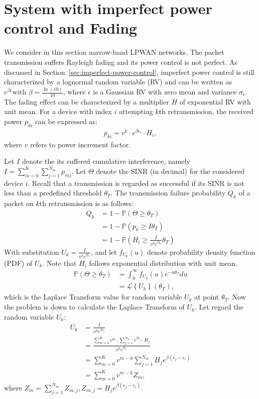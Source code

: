 \section{System with imperfect power control and Fading}
We consider in this section narrow-band LPWAN networks. The packet transmission suffers Rayleigh fading and its power control is not perfect. As discussed in Section~\ref{sec:imperfect-power-control}, imperfect power control is still characterized by a lognormal random variable (RV) and can be written as $e^{\beta\epsilon} \text{with }\beta = \frac{\ln(10)}{10}$, where $\epsilon$ is a Gaussian RV with zero mean and variance $\sigma_{\epsilon}$. The fading effect can be characterized by a multiplier $H$ of exponential RV with unit mean. For a device with index $i$ attempting $k$th retransmission, the received power $p_{ki}$ can be expressed as:
\begin{align*}
	p_{ki} = v^k \cdot e^{\beta\epsilon_i}\cdot H_i,
\end{align*}
where $v$ refers to power increment factor. 

Let $I$ denote the its suffered cumulative interference, namely $I =\sum_{m=0 }^{K} \sum_{j=1}^{N_m} p_{mj}$.
Let $\Theta$ denote the SINR (in decimal) for the considered device $i$. Recall that a transmission is regarded as successful if its SINR is not less than a predefined threshold $\theta_{T}$. The transmission failure probability $Q_{k}$ of a packet on $k$th retransmission is as follows:
\begin{align*}
	Q_{k} &=1 -  \mathbb{P} \left( \Theta \geq \theta_{T}\right) \\
	&= 1 - \mathbb{P} \left( p_k \geq I \theta_{T}\right) \\
	&= 1 - \mathbb{P} \left( H_i \geq \frac{I}{v^k e^{\beta\epsilon_i} } \theta_{T} \right) 
\end{align*}
With substitution $U_k=\frac{I}{v^k  e^{\beta\epsilon_i} }$, and let $f_{U_k}(u)$ denote probability density function (PDF) of $U_k$. Note that $H_i$ follows exponential distribution with unit mean.
\begin{align*}
	\mathbb{P} \left(\Theta \geq \theta_{T} \right) &= \int_{0}^{\infty} f_{U_k}(u) e^{ -u  \theta_{T} }du \\
	&= \mathcal{L} \left\lbrace U_k \right\rbrace \left(  \theta_{T}  \right),
\end{align*}
which is the Laplace Transform value for random variable $U_k$ at point $ \theta_{T} $. Now the problem is down to calculate the Laplace Transform of $U_k$. Let regard the random variable $U_k$:
\begin{align*}
	U_{k} &= \frac{I}{v^k e^{\beta\epsilon_i}} \\
	&=\frac{\sum_{m=0 }^{K}  v^m \cdot \sum_{j=1}^{N_m} e^{\beta\epsilon_j} \cdot H_j}{v^k e^{\beta\epsilon_i}} \\
	&= \sum_{m=0 }^{K}  v^{m-k} \sum_{j=1}^{N_m} H_j e^{\beta \left( \epsilon_j - \epsilon_i \right) }\\
	&=\sum_{m=0 }^{K}  v^{m-k} Z_m,
\end{align*}
where $Z_m = \sum_{j=1}^{N_m} Z_{m,j}, Z_{m,j} = H_j e^{\beta \left( \epsilon_j - \epsilon_i  \right)}$.

